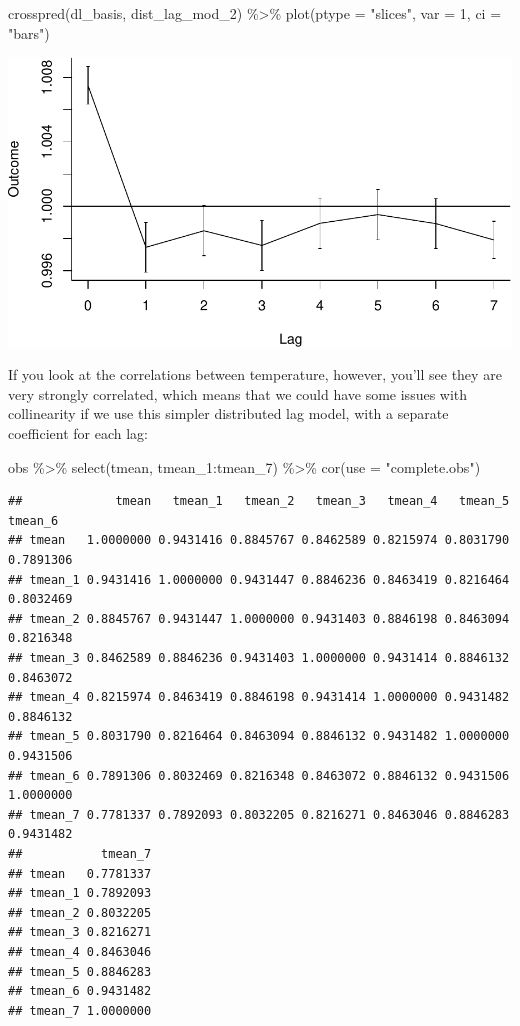 \documentclass[
]{book}
\newenvironment{Shaded}{\begin{snugshade}}{\end{snugshade}}
\newcommand{\AttributeTok}[1]{\textcolor[rgb]{0.77,0.63,0.00}{#1}}
\newcommand{\DecValTok}[1]{\textcolor[rgb]{0.00,0.00,0.81}{#1}}
\newcommand{\FunctionTok}[1]{\textcolor[rgb]{0.00,0.00,0.00}{#1}}
\newcommand{\NormalTok}[1]{#1}
\newcommand{\SpecialCharTok}[1]{\textcolor[rgb]{0.00,0.00,0.00}{#1}}
\newcommand{\StringTok}[1]{\textcolor[rgb]{0.31,0.60,0.02}{#1}}
\begin{document}
\begin{Shaded}
\begin{Highlighting}[]
\FunctionTok{crosspred}\NormalTok{(dl\_basis, dist\_lag\_mod\_2) }\SpecialCharTok{\%\textgreater{}\%} 
  \FunctionTok{plot}\NormalTok{(}\AttributeTok{ptype =} \StringTok{"slices"}\NormalTok{, }\AttributeTok{var =} \DecValTok{1}\NormalTok{, }\AttributeTok{ci =} \StringTok{"bars"}\NormalTok{)}
\end{Highlighting}
\end{Shaded}

\includegraphics{adv_epi_analysis_files/figure-latex/unnamed-chunk-95-1.pdf}

If you look at the correlations between temperature, however, you'll see they are very
strongly correlated, which means that we could have some issues with collinearity if we
use this simpler distributed lag model, with a separate coefficient for each lag:

\begin{Shaded}
\begin{Highlighting}[]
\NormalTok{obs }\SpecialCharTok{\%\textgreater{}\%} 
  \FunctionTok{select}\NormalTok{(tmean, tmean\_1}\SpecialCharTok{:}\NormalTok{tmean\_7) }\SpecialCharTok{\%\textgreater{}\%} 
  \FunctionTok{cor}\NormalTok{(}\AttributeTok{use =} \StringTok{"complete.obs"}\NormalTok{) }
\end{Highlighting}
\end{Shaded}

\begin{verbatim}
##             tmean   tmean_1   tmean_2   tmean_3   tmean_4   tmean_5   tmean_6
## tmean   1.0000000 0.9431416 0.8845767 0.8462589 0.8215974 0.8031790 0.7891306
## tmean_1 0.9431416 1.0000000 0.9431447 0.8846236 0.8463419 0.8216464 0.8032469
## tmean_2 0.8845767 0.9431447 1.0000000 0.9431403 0.8846198 0.8463094 0.8216348
## tmean_3 0.8462589 0.8846236 0.9431403 1.0000000 0.9431414 0.8846132 0.8463072
## tmean_4 0.8215974 0.8463419 0.8846198 0.9431414 1.0000000 0.9431482 0.8846132
## tmean_5 0.8031790 0.8216464 0.8463094 0.8846132 0.9431482 1.0000000 0.9431506
## tmean_6 0.7891306 0.8032469 0.8216348 0.8463072 0.8846132 0.9431506 1.0000000
## tmean_7 0.7781337 0.7892093 0.8032205 0.8216271 0.8463046 0.8846283 0.9431482
##           tmean_7
## tmean   0.7781337
## tmean_1 0.7892093
## tmean_2 0.8032205
## tmean_3 0.8216271
## tmean_4 0.8463046
## tmean_5 0.8846283
## tmean_6 0.9431482
## tmean_7 1.0000000
\end{verbatim}
\end{document}
